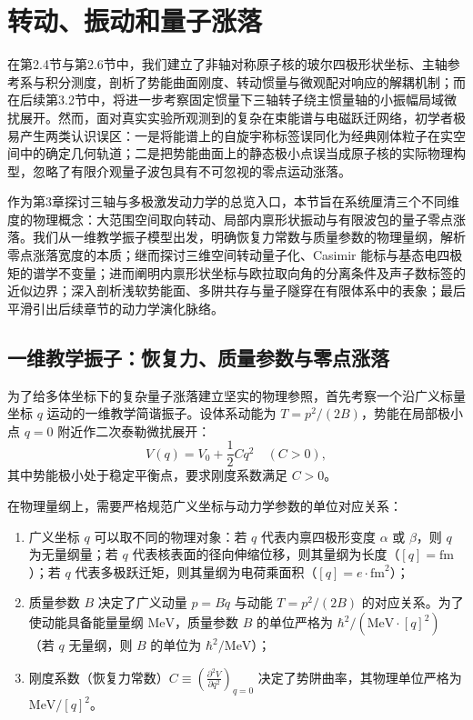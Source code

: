 \section{转动、振动和量子涨落}\label{sec:3-1}

在第2.4节与第2.6节中，我们建立了非轴对称原子核的玻尔四极形状坐标、主轴参考系与积分测度，剖析了势能曲面刚度、转动惯量与微观配对响应的解耦机制；而在后续第3.2节中，将进一步考察固定惯量下三轴转子绕主惯量轴的小振幅局域微扰展开。然而，面对真实实验所观测到的复杂在束能谱与电磁跃迁网络，初学者极易产生两类认识误区：一是将能谱上的自旋宇称标签误同化为经典刚体粒子在实空间中的确定几何轨道；二是把势能曲面上的静态极小点误当成原子核的实际物理构型，忽略了有限介观量子波包具有不可忽视的零点运动涨落。

作为第3章探讨三轴与多极激发动力学的总览入口，本节旨在系统厘清三个不同维度的物理概念：大范围空间取向转动、局部内禀形状振动与有限波包的量子零点涨落。我们从一维教学振子模型出发，明确恢复力常数与质量参数的物理量纲，解析零点涨落宽度的本质；继而探讨三维空间转动量子化、Casimir 能标与基态电四极矩的谱学不变量；进而阐明内禀形状坐标与欧拉取向角的分离条件及声子数标签的近似边界；深入剖析浅软势能面、多阱共存与量子隧穿在有限体系中的表象；最后平滑引出后续章节的动力学演化脉络。

\subsection{一维教学振子：恢复力、质量参数与零点涨落}\label{sec:3-1-1}

为了给多体坐标下的复杂量子涨落建立坚实的物理参照，首先考察一个沿广义标量坐标 $q$ 运动的一维教学简谐振子。设体系动能为 $T = p^2 / (2B)$，势能在局部极小点 $q = 0$ 附近作二次泰勒微扰展开：
\begin{equation}\label{eq:3-1-1d-potential}
V(q) = V_0 + \frac{1}{2} C q^2 \quad (C > 0),
\end{equation}
其中势能极小处于稳定平衡点，要求刚度系数满足 $C > 0$。

在物理量纲上，需要严格规范广义坐标与动力学参数的单位对应关系：
\begin{enumerate}
\item 广义坐标 $q$ 可以取不同的物理对象：若 $q$ 代表内禀四极形变度 $\alpha$ 或 $\beta$，则 $q$ 为无量纲量；若 $q$ 代表核表面的径向伸缩位移，则其量纲为长度（$[q] = \mathrm{fm}$）；若 $q$ 代表多极跃迁矩，则其量纲为电荷乘面积（$[q] = e\cdot\mathrm{fm}^2$）；
\item 质量参数 $B$ 决定了广义动量 $p = B \dot{q}$ 与动能 $T = p^2 / (2B)$ 的对应关系。为了使动能具备能量量纲 $\mathrm{MeV}$，质量参数 $B$ 的单位严格为 $\hbar^2 / (\mathrm{MeV} \cdot [q]^2)$（若 $q$ 无量纲，则 $B$ 的单位为 $\hbar^2 / \mathrm{MeV}$）；
\item 刚度系数（恢复力常数）$C \equiv \left( \frac{\partial^2 V}{\partial q^2} \right)_{q=0}$ 决定了势阱曲率，其物理单位严格为 $\mathrm{MeV} / [q]^2$。
\end{enumerate}

